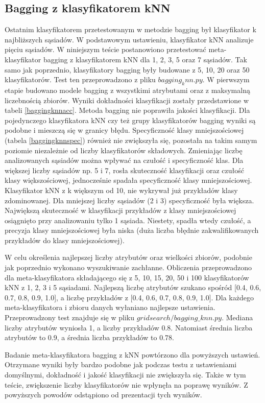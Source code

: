 \subsection{Bagging z klasyfikatorem kNN}
Ostatnim klasyfikatorem przetestowanym w metodzie bagging był klasyfikator k najbliższych sąsiadów. W podstawowym ustawieniu, klasyfikator kNN analizuje pięciu sąsiadów. W niniejszym teście postanowiono przetestować meta-klasyfikator bagging z klasyfikatorem kNN dla 1, 2, 3, 5 oraz 7 sąsiadów. Tak samo jak poprzednio, klasyfikatory bagging były budowane z 5, 10, 20 oraz 50 klasyfikatorów. Test ten przeprowadzono z pliku $bagging_knn.py$. W pierwszym etapie budowano modele bagging z wszystkimi atrybutami oraz z maksymalną liczebnością zbiorów. Wyniki dokładności klasyfikacji zostały przedstawione w tabeli \ref{baggingknnacc}. Metoda bagging nie poprawiła jakości klasyfikacji. Dla pojedynczego klasyfikatora kNN czy też grupy klasyfikatorów bagging wyniki są podobne i mieszczą się w granicy błędu. Specyficzność klasy mniejszościowej (tabela \ref{baggingknnspec}) również nie zwiększyła się, pozostała na takim samym poziomie niezależnie od liczby klasyfikatorów składowych. Zmieniając liczbę analizowanych sąsiadów można wpływać na czułość i specyficzność klas. Dla większej liczby sąsiadów np. 5 i 7, rosła skuteczność klasyfikacji oraz czułość klasy większościowej, jednocześnie spadała specyficzność klasy mniejszościowej. Klasyfikator kNN z k większym od 10, nie wykrywał już przykładów klasy zdominowanej. Dla mniejszej liczby sąsiadów (2 i 3) specyficzność była większa. Największą skuteczność w klasyfikacji przykładów z klasy mniejszościowej osiągnięto przy analizowaniu tylko 1 sąsiada. Niestety, spadła wtedy czułość, a precyzja klasy mniejszościowej była niska (duża liczba błędnie zakwalifikowanych przykładów do klasy mniejszościowej). \par
W celu określenia najlepszej liczby atrybutów oraz wielkości zbiorów, podobnie jak poprzednio wykonano wyszukiwanie zachłanne. Obliczenia przeprowadzono dla meta-klasyfikatora składającego się z 5, 10, 15, 20, 50 i 100 klasyfikatorów kNN z 1, 2, 3 i 5 sąsiadami. Najlepszą liczbę atrybutów szukano spośród [0.4, 0.6, 0.7, 0.8, 0.9, 1.0], a liczbę przykładów z [0.4, 0.6, 0.7, 0.8, 0.9, 1.0]. Dla każdego meta-klasyfikatora i zbioru danych wyłaniano najlepsze ustawienia. Przeprowadzony test znajduje się w pliku $gridsearch/bagging\_knn.py$. Mediana liczby atrybutów wyniosła 1, a liczby przykładów 0.8. Natomiast średnia liczba atrybutów to 0.9, a średnia liczba przykładów to 0.78. \par
Badanie meta-klasyfikatora bagging z kNN powtórzono dla powyższych ustawień. Otrzymane wyniki były bardzo podobne jak podczas testu z ustawieniami domyślnymi, dokładność i jakość klasyfikacji nie zwiększyła się. Także w tym teście, zwiększenie liczby klasyfikatorów nie wpłynęła na poprawę wyników. Z powyższych powodów odstąpiono od prezentacji tych wyników.

